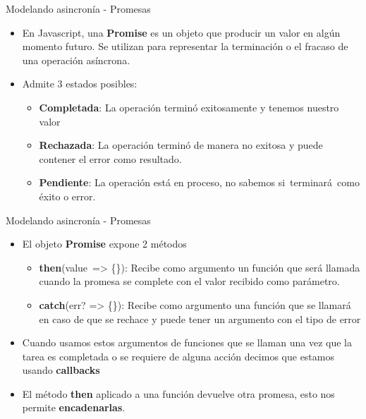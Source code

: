 \documentclass[aspectratio=43,10pt,t]{beamer}
\begin{document}
\begin{frame}{Modelando asincronía - Promesas}\relax
\begingroup
{}
\begin{itemize}
  \item En Javascript, una \textbf{Promise} es un objeto que  producir un valor en algún momento futuro. Se utilizan para representar la terminación o el fracaso de una operación asíncrona.
  \item Admite 3 estados posibles:
  \begin{itemize}
    \item \textbf{ Completada}: La operación terminó exitosamente y tenemos nuestro valor
    \item \textbf{ Rechazada}: La operación terminó de manera no exitosa y puede contener el error como resultado.
    \item \textbf{ Pendiente}: La operación está en proceso, no sabemos si~terminará~como éxito o error.
  \end{itemize}
\end{itemize}
\endgroup
\end{frame}

\begin{frame}{Modelando asincronía - Promesas}\relax
\begingroup
{}
\begin{itemize}
  \item El objeto \textbf{Promise} expone 2 métodos
  \begin{itemize}
    \item \textbf{then}(value~=> \{\}): Recibe como argumento un función que será llamada cuando la promesa se complete con el valor recibido como parámetro.
    \item \textbf{catch}(err? => \{\}): Recibe como argumento una función que se llamará en caso de que se rechace y puede tener un argumento con el tipo de error
  \end{itemize}
  \item Cuando usamos estos argumentos de funciones que se llaman una vez que la tarea es completada o se requiere de alguna acción decimos que estamos usando \textbf{callbacks}
  \item El método \textbf{then} aplicado a una función devuelve otra promesa, esto nos permite \textbf{encadenarlas}.
\end{itemize}
\endgroup
\end{frame}
\end{document}
